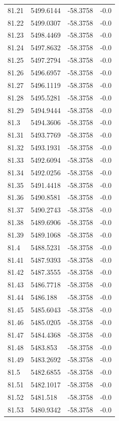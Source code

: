 \begin{table}[H]
\begin{tabular}{llll}
81.21 & 5499.6144 & -58.3758 & -0.0 \\
81.22 & 5499.0307 & -58.3758 & -0.0 \\
81.23 & 5498.4469 & -58.3758 & -0.0 \\
81.24 & 5497.8632 & -58.3758 & -0.0 \\
81.25 & 5497.2794 & -58.3758 & -0.0 \\
81.26 & 5496.6957 & -58.3758 & -0.0 \\
81.27 & 5496.1119 & -58.3758 & -0.0 \\
81.28 & 5495.5281 & -58.3758 & -0.0 \\
81.29 & 5494.9444 & -58.3758 & -0.0 \\
81.3 & 5494.3606 & -58.3758 & -0.0 \\
81.31 & 5493.7769 & -58.3758 & -0.0 \\
81.32 & 5493.1931 & -58.3758 & -0.0 \\
81.33 & 5492.6094 & -58.3758 & -0.0 \\
81.34 & 5492.0256 & -58.3758 & -0.0 \\
81.35 & 5491.4418 & -58.3758 & -0.0 \\
81.36 & 5490.8581 & -58.3758 & -0.0 \\
81.37 & 5490.2743 & -58.3758 & -0.0 \\
81.38 & 5489.6906 & -58.3758 & -0.0 \\
81.39 & 5489.1068 & -58.3758 & -0.0 \\
81.4 & 5488.5231 & -58.3758 & -0.0 \\
81.41 & 5487.9393 & -58.3758 & -0.0 \\
81.42 & 5487.3555 & -58.3758 & -0.0 \\
81.43 & 5486.7718 & -58.3758 & -0.0 \\
81.44 & 5486.188 & -58.3758 & -0.0 \\
81.45 & 5485.6043 & -58.3758 & -0.0 \\
81.46 & 5485.0205 & -58.3758 & -0.0 \\
81.47 & 5484.4368 & -58.3758 & -0.0 \\
81.48 & 5483.853 & -58.3758 & -0.0 \\
81.49 & 5483.2692 & -58.3758 & -0.0 \\
81.5 & 5482.6855 & -58.3758 & -0.0 \\
81.51 & 5482.1017 & -58.3758 & -0.0 \\
81.52 & 5481.518 & -58.3758 & -0.0 \\
81.53 & 5480.9342 & -58.3758 & -0.0 \\

\end{tabular}
\end{table}
